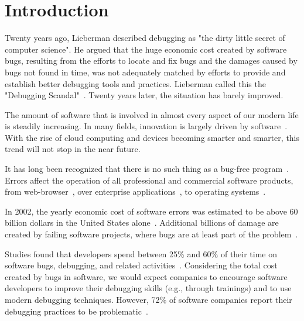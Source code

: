 \chapter{Introduction}
\label{sec:introduction}

Twenty years ago, Lieberman described debugging as "the dirty little secret of computer science".
He argued that the huge economic cost created by software bugs, resulting from the efforts to locate and fix bugs and the damages caused by bugs  not found in time, was not adequately matched by efforts to provide and establish better debugging tools and practices.
Lieberman called this the "Debugging Scandal"~\cite{lieberman_97_the_debugging_scandal}.
Twenty years later, the situation has barely improved.

The amount of software that is involved in almost every aspect of our modern life is steadily increasing.
In many fields, innovation is largely driven by software~\cite{evans_08_invisible_engines_how_software, gorschek_10_a_lightweight_innovation_process}.
With the rise of cloud computing and devices becoming smarter and smarter, this trend will not stop in the near future.

It has long been recognized that there is no such thing as a bug-free program~\cite{schwartz_71_an_overview_of_bugs}.
Errors affect the operation of all professional and commercial software products, from web-browser~\cite{li_06_have_things_changed_now}, over enterprise applications~\cite{turhan_09_data_mining_source_code, sahoo_10_an_empirical_study}, to operating systems~\cite{guo_10_characterizing_and_predicting_which}. %

In 2002, the yearly economic cost of software errors was estimated to be above 60 billion dollars in the United States alone~\cite{tassey_02_the_economic_impacts}. 
Additional billions of damage are created by failing software projects, where bugs are at least part of the problem~\cite{charette_05_why_software_fails}.

Studies found that developers spend between 25\% and 60\% of their time on software bugs, debugging, and related activities~\cite{ballou_08_improving_software_quality, hailpern_02_software_debugging_testing, beizer_03_software_testing_techniques}.
Considering the total cost created by bugs in software, we would expect companies to encourage software developers to improve their debugging skills (e.g., through trainings) and to use modern debugging techniques.
However, 72\% of software companies report their debugging practices to be problematic~\cite{ballou_08_improving_software_quality}.

